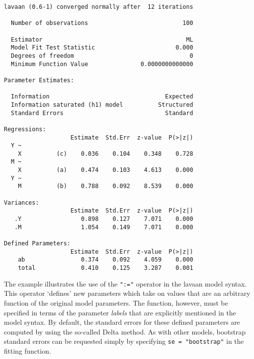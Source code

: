 \begin{verbatim}
lavaan (0.6-1) converged normally after  12 iterations

  Number of observations                           100

  Estimator                                         ML
  Model Fit Test Statistic                       0.000
  Degrees of freedom                                 0
  Minimum Function Value               0.0000000000000

Parameter Estimates:

  Information                                 Expected
  Information saturated (h1) model          Structured
  Standard Errors                             Standard

Regressions:
                   Estimate  Std.Err  z-value  P(>|z|)
  Y ~                                                 
    X          (c)    0.036    0.104    0.348    0.728
  M ~                                                 
    X          (a)    0.474    0.103    4.613    0.000
  Y ~                                                 
    M          (b)    0.788    0.092    8.539    0.000

Variances:
                   Estimate  Std.Err  z-value  P(>|z|)
   .Y                 0.898    0.127    7.071    0.000
   .M                 1.054    0.149    7.071    0.000

Defined Parameters:
                   Estimate  Std.Err  z-value  P(>|z|)
    ab                0.374    0.092    4.059    0.000
    total             0.410    0.125    3.287    0.001
\end{verbatim}

The example illustrates the use of the \texttt{":="} operator in the
lavaan model syntax. This operator `defines' new parameters which take
on values that are an arbitrary function of the original model
parameters. The function, however, must be specified in terms of the
parameter \emph{labels} that are explicitly mentioned in the model
syntax. By default, the standard errors for these defined parameters are
computed by using the so-called Delta method. As with other models,
bootstrap standard errors can be requested simply by specifying
\texttt{se\ =\ "bootstrap"} in the fitting function.

